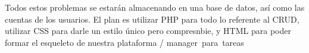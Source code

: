 \documentclass[11pt]{scrartcl}
\begin{document}
Todos estos problemas se estarán almacenando en una base de datos, así como las cuentas de los usuarios. El plan es utilizar PHP para todo lo referente al CRUD, utilizar CSS para darle un estilo único pero compresnbie, y HTML para poder formar el esqueleto de nuestra plataforma / manager para tareas

    
\end{document}
